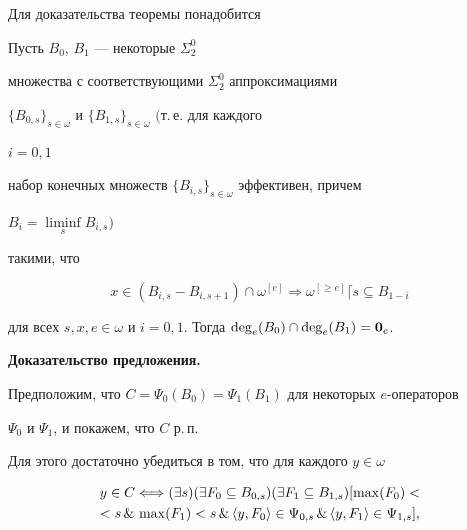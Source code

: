 Для доказательства теоремы понадобится





\begin{propnonum}


Пусть $B_0$, $B_1$ --- некоторые $\Sigma_2^0$


множества с соответствующими $\Sigma_2^0$ аппроксимациями


$\{B_{0,s}\}_{s\in\omega}$ и $\{B_{1,s}\}_{s\in\omega}$ $($т.\,е. для каждого


$i=0,1$


набор конечных множеств $\{B_{i,s}\}_{s\in\omega}$ эффективен, причем 


$B_i=\liminf\limits_s B_{i,s})$


такими, что


$$


x\in(B_{i,s}-B_{i,s+1})\cap\omega^{[e]}\Longrightarrow\omega^{[\ge e]}


\lceil s\subseteq B_{1-i}


$$


для всех $s,x,e\in\omega$ и $i=0,1$. Тогда $\deg_e(B_0)\cap\deg_e(B_1)=


\dg 0_e$.


\end{propnonum}





{\bf Доказательство предложения.}


Предположим, что $C=\Psi_0({B_0})=\Psi_1({B_1})$ для некоторых $e$-операторов


$\Psi_0$ и $\Psi_1$, и покажем, что $C$ р.\,п.





Для этого достаточно убедиться в том, что для каждого $y\in\omega$


\begin{multline*}


y\in C\Longleftrightarrow


(\exists s)(\exists F_0\subseteq B_{0,s})(\exists F_1\subseteq B_{1,s})


[\max(F_0)< \\


<s \,\&\, \max(F_1)<s\,\&\,


\aq{y,F_0}\in\Psi_{0,s}\,\&\,\aq{y, F_1}\in\Psi_{1,s}],


\end{multline*}


